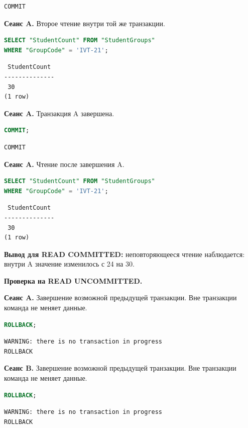 \documentclass[12pt,a4paper]{article}
\begin{document}
\begin{lstlisting}
COMMIT
\end{lstlisting}

\textbf{Сеанс A.} Второе чтение внутри той же транзакции.
\begin{lstlisting}[language=SQL]
SELECT "StudentCount" FROM "StudentGroups"
WHERE "GroupCode" = 'IVT-21';
\end{lstlisting}

\begin{lstlisting}
 StudentCount
--------------
 30
(1 row)
\end{lstlisting}

\textbf{Сеанс A.} Транзакция A завершена.
\begin{lstlisting}[language=SQL]
COMMIT;
\end{lstlisting}

\begin{lstlisting}
COMMIT
\end{lstlisting}

\textbf{Сеанс A.} Чтение после завершения A.
\begin{lstlisting}[language=SQL]
SELECT "StudentCount" FROM "StudentGroups"
WHERE "GroupCode" = 'IVT-21';
\end{lstlisting}

\begin{lstlisting}
 StudentCount
--------------
 30
(1 row)
\end{lstlisting}

\textbf{Вывод для READ COMMITTED:} неповторяющееся чтение наблюдается: внутри A значение изменилось с 24 на 30.

\textbf{Проверка на READ UNCOMMITTED.}

\textbf{Сеанс A.} Завершение возможной предыдущей транзакции. Вне транзакции команда не меняет данные.
\begin{lstlisting}[language=SQL]
ROLLBACK;
\end{lstlisting}

\begin{lstlisting}
WARNING: there is no transaction in progress
ROLLBACK
\end{lstlisting}

\textbf{Сеанс B.} Завершение возможной предыдущей транзакции. Вне транзакции команда не меняет данные.
\begin{lstlisting}[language=SQL]
ROLLBACK;
\end{lstlisting}

\begin{lstlisting}
WARNING: there is no transaction in progress
ROLLBACK
\end{lstlisting}
\end{document}
